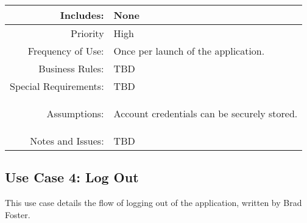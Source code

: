 \documentclass[12pt,oneside,letterpaper]{article}
\newenvironment{packed_enumerate}{ %
\vspace{-7mm}
\begin{enumerate}
  \setlength{\itemsep}{0pt}
  \setlength{\parskip}{0pt}
  \setlength{\parsep}{0pt}
}{\end{enumerate}
\vspace{-8mm}}
\begin{document}
\begin{longtable}{|r|p{3.8in}|}
\hline
Includes:&None\\
\hline
Priority&High\\
\hline
Frequency of Use:&Once per launch of the application.\\
\hline
Business Rules:&TBD\\
\hline
Special Requirements:&TBD\\
\hline
Assumptions:&\begin{packed_enumerate}
\item Account credentials can be securely stored.
\end{packed_enumerate}\\
\hline
Notes and Issues:&TBD\\
\hline
\end{longtable}

\subsection{\label{Log In}Use Case 4: Log Out}
This use case details the flow of logging out of the application, written by Brad Foster.
\end{document}
